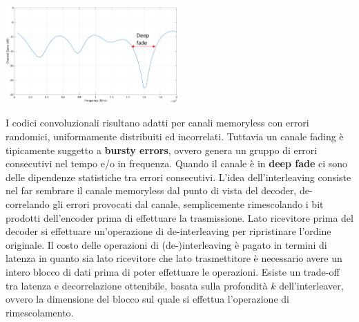 \begin{center}
\end{center}
\begin{center}
    \includegraphics[width=0.5\textwidth]{imgs/deep_fade.png}
\end{center}

I codici convoluzionali risultano adatti per canali memoryless con errori randomici, uniformamente distribuiti ed incorrelati. 
Tuttavia un canale fading è tipicamente suggetto a \textbf{bursty errors}, ovvero genera un gruppo di errori consecutivi nel tempo e/o in frequenza. 
Quando il canale è in \textbf{deep fade} ci sono delle dipendenze statistiche tra errori consecutivi.
L'idea dell'interleaving consiste nel far sembrare il canale memoryless dal punto di vista del decoder, de-correlando gli errori provocati dal canale, semplicemente rimescolando i bit prodotti dell'encoder prima di effettuare la trasmissione.
Lato ricevitore prima del decoder si effettuare un'operazione di de-interleaving per ripristinare l'ordine originale.
Il costo delle operazioni di (de-)interleaving è pagato in termini di latenza in quanto sia lato ricevitore che lato trasmettitore è necessario avere un intero blocco di dati prima di poter effettuare le operazioni. 
Esiste un trade-off tra latenza e decorrelazione ottenibile, basata sulla profondità $k$ dell'interleaver, ovvero la dimensione del blocco sul quale si effettua l'operazione di rimescolamento.

